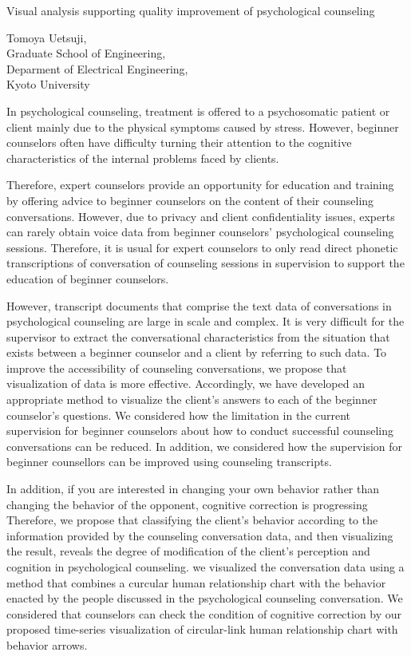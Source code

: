 \begin{flushleft}
\Large
Visual analysis supporting quality improvement of psychological counseling
\end{flushleft}
\begin{flushright}
Tomoya Uetsuji, \\
Graduate School of Engineering, \\
Deparment of Electrical Engineering,\\
Kyoto University
\end{flushright}
\hspace{20zw}
In psychological counseling, treatment is offered to a psychosomatic patient or client mainly due to the physical symptoms caused by stress. However, beginner counselors often have difficulty turning their attention to the cognitive characteristics of the internal problems faced by clients.

 Therefore, expert counselors provide an opportunity for education and training by offering advice to beginner counselors on the content of their counseling conversations. However, due to privacy and client confidentiality issues, experts can rarely obtain voice data from beginner counselors' psychological counseling sessions. Therefore, it is usual for expert counselors to only read direct phonetic transcriptions of conversation of counseling sessions in supervision to support the education of beginner counselors.

However, transcript documents that comprise the text data of conversations in psychological counseling are large in scale and complex. It is very difficult for the supervisor to extract the conversational characteristics from the situation that exists between a beginner counselor and a client by referring to such data. To improve the accessibility of counseling conversations, we propose that visualization of data is more effective. Accordingly, we have developed an appropriate method to visualize the client's answers to each of the beginner counselor's questions. We considered how the limitation in the current supervision for beginner counselors about how to conduct successful counseling conversations can be reduced. In addition, we considered how the supervision for beginner counsellors can be improved using counseling transcripts.

 In addition, if you are interested in changing your own behavior rather than changing the behavior of the opponent, cognitive correction is progressing Therefore, we propose that classifying the client's behavior according to the information provided by the counseling conversation data, and then visualizing the result, reveals the degree of modification of the client's perception and cognition in psychological counseling. we visualized the conversation data using a method that combines a curcular human relationship chart with the behavior enacted by the people discussed in the psychological counseling conversation. We considered that counselors can check the condition of cognitive correction by our proposed time-series visualization of circular-link human relationship chart with behavior arrows.
